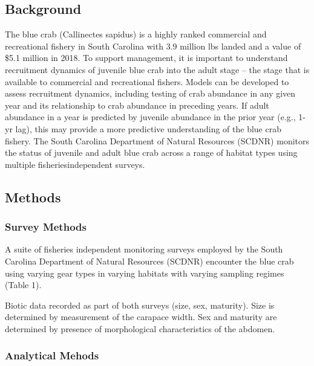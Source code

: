 \documentclass[
]{article}
\begin{document}
{
\setcounter{tocdepth}{2}
\tableofcontents
}
\newpage

\hypertarget{background}{%
\subsection{Background}\label{background}}

The blue crab (Callinectes sapidus) is a highly ranked commercial and
recreational fishery in South Carolina with 3.9 million lbs landed and a
value of \$5.1 million in 2018. To support management, it is important
to understand recruitment dynamics of juvenile blue crab into the adult
stage -- the stage that is available to commercial and recreational
fishers. Models can be developed to assess recruitment dynamics,
including testing of crab abundance in any given year and its
relationship to crab abundance in preceding years. If adult abundance in
a year is predicted by juvenile abundance in the prior year (e.g., 1-yr
lag), this may provide a more predictive understanding of the blue crab
fishery. The South Carolina Department of Natural Resources (SCDNR)
monitors the status of juvenile and adult blue crab across a range of
habitat types using multiple fisheriesindependent surveys.

\newpage

\hypertarget{methods}{%
\subsection{Methods}\label{methods}}

\hypertarget{survey-methods}{%
\subsubsection{Survey Methods}\label{survey-methods}}

A suite of fisheries independent monitoring surveys employed by the
South Carolina Department of Natural Resources (SCDNR) encounter the
blue crab using varying gear types in varying habitats with varying
sampling regimes (Table 1).

Biotic data recorded as part of both surveys (size, sex, maturity). Size
is determined by measurement of the carapace width. Sex and maturity are
determined by presence of morphological characteristics of the abdomen.

\hypertarget{analytical-mehods}{%
\subsubsection{Analytical Mehods}\label{analytical-mehods}}
\end{document}
